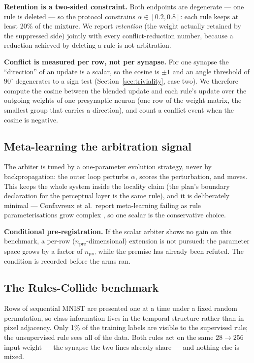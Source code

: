 \documentclass[11pt]{article}
\begin{document}
\textbf{Retention is a two-sided constraint.} Both endpoints are degenerate --- one rule is
deleted --- so the protocol constrains $\alpha \in [0.2, 0.8]$: each rule keeps at least 20\% of
the mixture. We report \emph{retention} (the weight actually retained by the suppressed side)
jointly with every conflict-reduction number, because a reduction achieved by deleting a rule is
not arbitration.

\textbf{Conflict is measured per row, not per synapse.} For one synapse the ``direction'' of an
update is a scalar, so the cosine is $\pm 1$ and an angle threshold of $90^\circ$ degenerates to
a sign test (Section~\ref{sec:triviality}, case two). We therefore compute the cosine between the
blended update and each rule's update over the outgoing weights of one presynaptic neuron (one
row of the weight matrix, the smallest group that carries a direction), and count a conflict event
when the cosine is negative.

\subsection{Meta-learning the arbitration signal}\label{sec:methods-meta}

The arbiter is tuned by a one-parameter evolution strategy, never by backpropagation: the outer
loop perturbs $\alpha$, scores the perturbation, and moves. This keeps the whole system inside the
locality claim (the plan's boundary declaration for the perceptual layer is the same rule), and it
is deliberately minimal --- Confavreux et al.\ report meta-learning failing as rule
parameterisations grow complex \citep{confavreux2025}, so one scalar is the conservative choice.

\textbf{Conditional pre-registration.} If the scalar arbiter shows no gain on this benchmark, a
per-row ($n_{\text{pre}}$-dimensional) extension is not pursued: the parameter space grows by a
factor of $n_{\text{pre}}$ while the premise has already been refuted. The condition is recorded
before the arms ran.

\subsection{The Rules-Collide benchmark}

Rows of sequential MNIST are presented one at a time under a fixed random permutation, so class
information lives in the temporal structure rather than in pixel adjacency. Only 1\% of the
training labels are visible to the supervised rule; the unsupervised rule sees all of the data.
Both rules act on the same $28 \to 256$ input weight --- the synapse the two lines already share ---
and nothing else is mixed.
\end{document}
